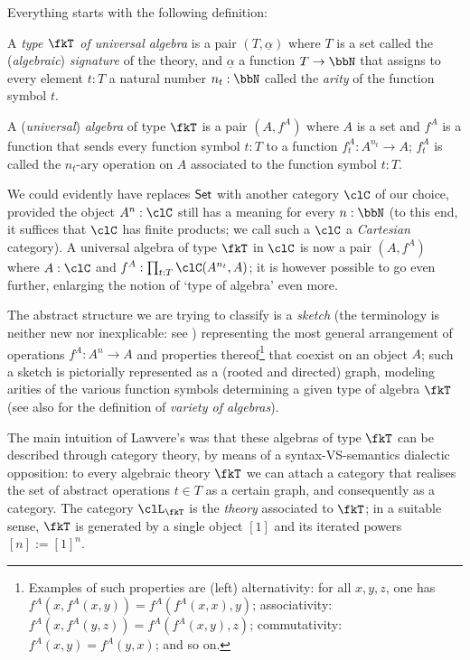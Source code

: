 Everything starts with the following definition:
\begin{definition}\label{unialg}
    A \emph{type $\fkT$ of universal algebra} is a pair $(T,\underline{\alpha})$ where $T$ is a set called the (\emph{algebraic}) \emph{signature} of the theory, and $\underline\alpha$ a function $T \to \bbN$ that assigns to every element $t: T$ a natural number $n_t: \bbN$ called the \emph{arity} of the function symbol $t$.
\end{definition}
\begin{definition}
    A (\emph{universal}) \emph{algebra} of type $\fkT$ is a pair $(A,f^A)$ where $A$ is a set and $f^A$ is a function that sends every function symbol $t: T$ to a function $f^A_t: A^{n_t} \to A$; $f^A_t$ is called the $n_t$-ary operation on $A$ associated to the function symbol $t: T$.
\end{definition}
We could evidently have replaces $\mathsf{Set}$ with another category $\clC$ of our choice, provided the object $A^n: \clC$ still has a meaning for every $n: \bbN$ (to this end, it suffices that $\clC$ has finite products; we call such a $\clC$ a \emph{Cartesian} category). A universal algebra of type $\fkT$ in $\clC$ is now a pair $(A,f^A)$ where $A: \clC$ and $f^A: \prod_{t: T} \clC(A^{n_t},A )$; it is however possible to go even further, enlarging the notion of `type of algebra' even more.

The abstract structure we are trying to classify is a \emph{sketch} (the terminology is neither new nor inexplicable: see \cite{ehresmann1968esquisses,coppey1984leccons, Bor2}) representing the most general arrangement of operations $f^A: A^n \to A$ and properties thereof\footnote{Examples of such properties are (left) alternativity: for all $x,y,z$, one has $f^A(x,f^A(x,y)) = f^A(f^A(x,x),y)$; associativity: $f^A(x,f^A(y,z)) = f^A(f^A(x,y),z)$; commutativity: $f^A(x,y)=f^A(y,x)$; and so on.} that coexist on an object $A$; such a sketch is pictorially represented as a (rooted and directed) graph, modeling arities of the various function symbols determining a given type of algebra $\fkT$ (see also \cite[XV.3]{grillet2007abstract} for the definition of \emph{variety of algebras}).

The main intuition of Lawvere's \cite{lawvere1963functorial} was that these algebras of type $\fkT$ can be described through category theory, by means of a syntax-VS-semantics dialectic opposition: to every algebraic theory $\fkT$ we can attach a category that realises the set of abstract operations $t\in T$ as a certain graph, and consequently as a category. The category $\clL_\fkT$ is the \emph{theory} associated to $\fkT$; in a suitable sense, $\fkT$ is generated by a single object $[1]$ and its iterated powers $[n] := [1]^n$. 

